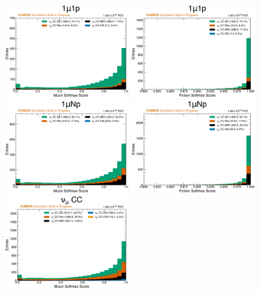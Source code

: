 \begin{figure}[!htb]
    \centering
    \includegraphics[width=0.48\textwidth]{figures/neutrino_selection/signal_hist1d_1mu1p_muon_softmax.pdf}
    \includegraphics[width=0.48\textwidth]{figures/neutrino_selection/signal_hist1d_1mu1p_proton_softmax.pdf}
    \\
    \includegraphics[width=0.48\textwidth]{figures/neutrino_selection/signal_hist1d_1muNp_muon_softmax.pdf}
    \includegraphics[width=0.48\textwidth]{figures/neutrino_selection/signal_hist1d_1muNp_proton_softmax.pdf}
    \\
    \includegraphics[width=0.48\textwidth]{figures/neutrino_selection/signal_hist1d_1muX_muon_softmax.pdf}

\end{figure}
